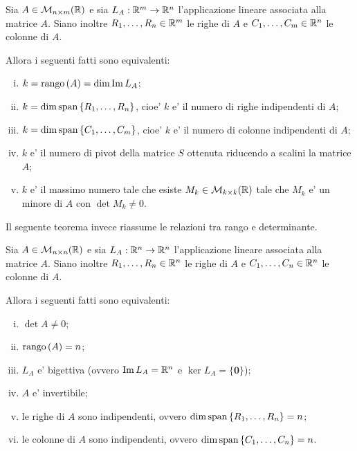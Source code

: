 \begin{theorem}\label{equivalenza_definizioni_di_rango}
    Sia $A \in \mathcal{M}_{n \times m}(\mathbb{R})$ e sia $L_A : \mathbb{R}^m \to \mathbb{R}^n$ l'applicazione lineare associata alla matrice $A$. Siano inoltre $R_1, \dots, R_n \in \mathbb{R}^m$ le righe di $A$ e $C_1, \dots, C_m \in \mathbb{R}^n$ le colonne di $A$. 
    
    Allora i seguenti fatti sono equivalenti:
    \begin{enumerate}
        [(i)]
        \item $k = \operatorname{rango}\left( A \right) = \dim \operatorname{Im}L_A$;
        \item $k = \dim \operatorname{span}\left\{R_1, \dots, R_n\right\}$, cioe' $k$ e' il numero di righe indipendenti di $A$;
        \item $k = \dim \operatorname{span}\left\{C_1, \dots, C_m\right\}$, cioe' $k$ e' il numero di colonne indipendenti di $A$;
        \item $k$ e' il numero di pivot della matrice $S$ ottenuta riducendo a scalini la matrice $A$;
        \item $k$ e' il massimo numero tale che esiste $M_k \in \mathcal{M}_{k \times k}(\mathbb{R})$ tale che $M_k$ e' un minore di $A$ con $\det M_k \neq 0$.
    \end{enumerate}
\end{theorem}

Il seguente teorema invece riassume le relazioni tra rango e determinante.

\begin{theorem}\label{relazioni_determinante_rango}
    Sia $A \in \mathcal{M}_{n \times n}(\mathbb{R})$ e sia $L_A : \mathbb{R}^n \to \mathbb{R}^n$ l'applicazione lineare associata alla matrice $A$. Siano inoltre $R_1, \dots, R_n \in \mathbb{R}^n$ le righe di $A$ e $C_1, \dots, C_n \in \mathbb{R}^n$ le colonne di $A$. 
    
    Allora i seguenti fatti sono equivalenti:
    \begin{enumerate}
        [(i)]
        \item $\det A \neq 0$;
        \item $\operatorname{rango}\left( A \right) = n$;
        \item $L_A$ e' bigettiva (ovvero $\operatorname{Im}L_A = \mathbb{R}^n$ e $\ker L_A = \{\bm 0\}$);
        \item $A$ e' invertibile;
        \item le righe di $A$ sono indipendenti, ovvero $\dim \operatorname{span}\left\{R_1, \dots, R_n\right\} = n$;
        \item le colonne di $A$ sono indipendenti, ovvero $\dim \operatorname{span}\left\{C_1, \dots, C_n\right\} = n$.
    \end{enumerate}
\end{theorem}